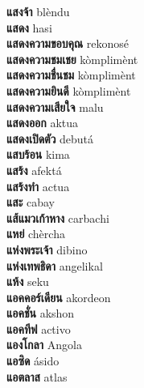 \textbf{ แสงจ้า  } blèndu \\
\textbf{ แสดง  } hasi \\
\textbf{ แสดงความขอบคุณ  } rekonosé \\
\textbf{ แสดงความชมเชย  } kòmplimènt \\
\textbf{ แสดงความชื่นชม  } kòmplimènt \\
\textbf{ แสดงความยินดี  } kòmplimènt \\
\textbf{ แสดงความเสียใจ  } malu \\
\textbf{ แสดงออก  } aktua \\
\textbf{ แสดงเปิดตัว  } debutá \\
\textbf{ แสบร้อน  } kima \\
\textbf{ แสร้ง  } afektá \\
\textbf{ แสร้งทำ  } actua \\
\textbf{ แสะ  } cabay \\
\textbf{ แส้แมวเก้าหาง  } carbachi \\
\textbf{ แหย่  } chèrcha \\
\textbf{ แห่งพระเจ้า  } dibino \\
\textbf{ แห่งเทพธิดา  } angelikal \\
\textbf{ แห้ง  } seku \\
\textbf{ แอคคอร์เดียน  } akordeon \\
\textbf{ แอคชั่น  } akshon \\
\textbf{ แอคทีฟ  } activo \\
\textbf{ แองโกลา  } Angola \\
\textbf{ แอซิด  } ásido \\
\textbf{ แอตลาส  } atlas \\
